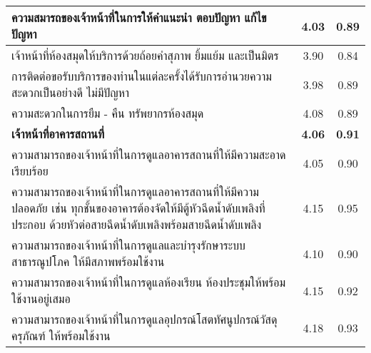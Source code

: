 \begin{longtable}{|>{\raggedright}p{9cm}|c|c|}
		ความสมารถของเจ้าหน้าที่ในการให้คำแนะนำ ตอบปัญหา แก้ไขปัญหา                                                                                                                    & 4.03                            & 0.89        \\ \hline
		เจ้าหน้าที่ห้องสมุดให้บริการด้วยถ้อยคำสุภาพ ยิ้มแย้ม และเป็นมิตร                                                                                                              & 3.90                            & 0.84        \\ \hline
		การติดต่อขอรับบริการของท่านในแต่ละครั้งได้รับการอำนวยความสะดวกเป็นอย่างดี ไม่มีปัญหา                                                                                          & 3.98                            & 0.89        \\ \hline
		ความสะดวกในการยืม - คืน ทรัพยากรห้องสมุด                                                                                                                                      & 4.08                            & 0.89        \\ \hline
		\textbf{เจ้าหน้าที่อาคารสถานที่}                                                                                                                                              & \textbf{4.06}                            & \textbf{0.91 }       \\ \hline
		ความสามารถของเจ้าหน้าที่ในการดูแลอาคารสถานที่ให้มีความสะอาดเรียบร้อย                                                                                                          & 4.05                            & 0.90        \\ \hline
		ความสามารถของเจ้าหน้าที่ในการดูแลอาคารสถานที่ให้มีความปลอดภัย เช่น ทุกชั้นของอาคารต้องจัดให้มีตู้หัวฉีดน้ำดับเพลิงที่ประกอบ ด้วยหัวต่อสายฉีดน้ำดับเพลิงพร้อมสายฉีดน้ำดับเพลิง & 4.15                            & 0.95        \\ \hline
		ความสามารถของเจ้าหน้าที่ในการดูแลและบำรุงรักษาระบบสาธารณูปโภค ให้มีสภาพพร้อมใช้งาน                                                                                            & 4.10                            & 0.90        \\ \hline
		ความสามารถของเจ้าหน้าที่ในการดูแลห้องเรียน ห้องประชุมให้พร้อมใช้งานอยู่เสมอ                                                                                                   & 4.15                            & 0.92        \\ \hline
		ความสามารถของเจ้าหน้าที่ในการดูแลอุปกรณ์โสตทัศนูปกรณ์วัสดุ ครุภัณฑ์ ให้พร้อมใช้งาน                                                                                            & 4.18                            & 0.93        \\ \hline

\end{longtable}
